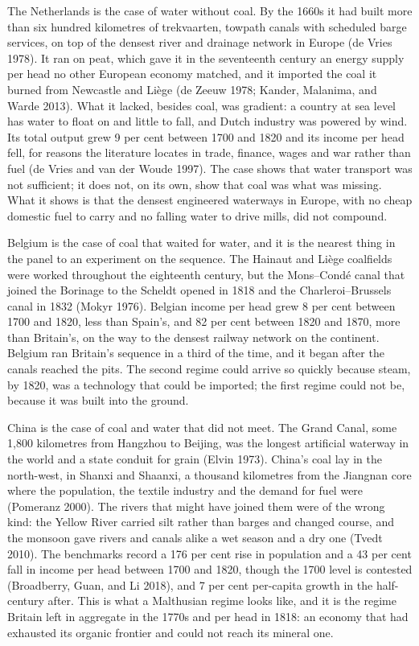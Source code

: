 \documentclass[
  11pt,
]{article}
\begin{document}
The Netherlands is the case of water without coal. By the 1660s it had
built more than six hundred kilometres of trekvaarten, towpath canals
with scheduled barge services, on top of the densest river and drainage
network in Europe (de Vries 1978). It ran on peat, which gave it in the
seventeenth century an energy supply per head no other European economy
matched, and it imported the coal it burned from Newcastle and Liège (de
Zeeuw 1978; Kander, Malanima, and Warde 2013). What it lacked, besides
coal, was gradient: a country at sea level has water to float on and
little to fall, and Dutch industry was powered by wind. Its total output
grew 9 per cent between 1700 and 1820 and its income per head fell, for
reasons the literature locates in trade, finance, wages and war rather
than fuel (de Vries and van der Woude 1997). The case shows that water
transport was not sufficient; it does not, on its own, show that coal
was what was missing. What it shows is that the densest engineered
waterways in Europe, with no cheap domestic fuel to carry and no falling
water to drive mills, did not compound.

Belgium is the case of coal that waited for water, and it is the nearest
thing in the panel to an experiment on the sequence. The Hainaut and
Liège coalfields were worked throughout the eighteenth century, but the
Mons--Condé canal that joined the Borinage to the Scheldt opened in 1818
and the Charleroi--Brussels canal in 1832 (Mokyr 1976). Belgian income
per head grew 8 per cent between 1700 and 1820, less than Spain's, and
82 per cent between 1820 and 1870, more than Britain's, on the way to
the densest railway network on the continent. Belgium ran Britain's
sequence in a third of the time, and it began after the canals reached
the pits. The second regime could arrive so quickly because steam, by
1820, was a technology that could be imported; the first regime could
not be, because it was built into the ground.

China is the case of coal and water that did not meet. The Grand Canal,
some 1,800 kilometres from Hangzhou to Beijing, was the longest
artificial waterway in the world and a state conduit for grain (Elvin
1973). China's coal lay in the north-west, in Shanxi and Shaanxi, a
thousand kilometres from the Jiangnan core where the population, the
textile industry and the demand for fuel were (Pomeranz 2000). The
rivers that might have joined them were of the wrong kind: the Yellow
River carried silt rather than barges and changed course, and the
monsoon gave rivers and canals alike a wet season and a dry one (Tvedt
2010). The benchmarks record a 176 per cent rise in population and a 43
per cent fall in income per head between 1700 and 1820, though the 1700
level is contested (Broadberry, Guan, and Li 2018), and 7 per cent
per-capita growth in the half-century after. This is what a Malthusian
regime looks like, and it is the regime Britain left in aggregate in the
1770s and per head in 1818: an economy that had exhausted its organic
frontier and could not reach its mineral one.
\end{document}
